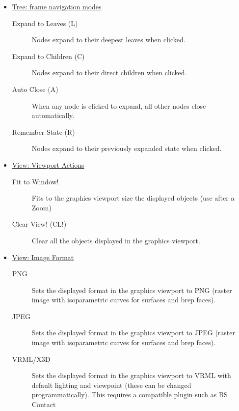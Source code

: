 \documentclass [11pt]{book}
\begin{document}
\begin{itemize}
\begin{description}
\end{description}



\item 
\underline{Tree: frame navigation modes}

\begin{description}

\item [Expand to Leaves (L)]
Nodes expand to their deepest leaves when clicked. 

\item [Expand to Children (C)]
Nodes expand to their direct children when clicked.

\item [Auto Close (A)]
When any node is clicked to expand, all other nodes close automatically.

\item [Remember State (R)]
Nodes expand to their previously expanded state when clicked.

\end{description}



\item 
\underline{View: Viewport Actions}

\begin{description}

\item [Fit to Window!]
Fits to the graphics viewport size the displayed objects (use after a Zoom)

\item [Clear View! (CL!)]
Clear all the objects displayed in the graphics viewport.

\end{description}



\item 
\underline{View: Image Format}

\begin{description}

\item [PNG]
Sets the displayed format in the graphics viewport to PNG (raster image with 
        isoparametric curves for surfaces and brep faces).

\item [JPEG]
Sets the displayed format in the graphics viewport to JPEG
         (raster image with isoparametric curves for surfaces and brep faces).

\item [VRML/X3D]
Sets the displayed format in the graphics viewport to
             VRML with default lighting and viewpoint (these can be changed
             programmatically). This requires a compatible plugin such as BS Contact


\end{description}
\end{itemize}
\end{document}
